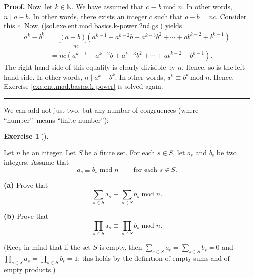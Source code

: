 \documentclass[numbers=enddot,12pt,final,onecolumn,notitlepage]{scrartcl}%
\newcounter{exer}
\numberwithin{exer}{subsection}
\theoremstyle{definition}
\newtheorem{exmp}[exer]{Exercise}
\newenvironment{exercise}[1][]
{\begin{exmp}[#1]\begin{leftbar}}
{\end{leftbar}\end{exmp}}
\newenvironment{fineprint}{\begin{small}}{\end{small}}
\newenvironment{proof}[1][Proof]{\noindent\textbf{#1.} }{\ \rule{0.5em}{0.5em}}
\let\sumnonlimits\sum
\let\prodnonlimits\prod
\renewcommand{\sum}{\sumnonlimits\limits}
\renewcommand{\prod}{\prodnonlimits\limits}
\begin{document}
\begin{fineprint}
\begin{proof}
Now, let $k\in\mathbb{N}$. We have assumed that $a\equiv b\operatorname{mod}%
n$. In other words, $n\mid a-b$. In other words, there exists an integer $c$
such that $a-b=nc$. Consider this $c$. Now,
(\ref{sol.exe.ent.mod.basics.k-power.2nd.gs}) yields%
\begin{align*}
a^{k}-b^{k}  &  =\underbrace{\left(  a-b\right)  }_{=nc}\left(  a^{k-1}%
+a^{k-2}b+a^{k-3}b^{2}+\cdots+ab^{k-2}+b^{k-1}\right) \\
&  =nc\left(  a^{k-1}+a^{k-2}b+a^{k-3}b^{2}+\cdots+ab^{k-2}+b^{k-1}\right)  .
\end{align*}
The right hand side of this equality is clearly divisible by $n$. Hence, so is
the left hand side. In other words, $n\mid a^{k}-b^{k}$. In other words,
$a^{k}\equiv b^{k}\operatorname{mod}n$. Hence, Exercise
\ref{exe.ent.mod.basics.k-power} is solved again.
\end{proof}
\end{fineprint}

We can add not just two, but any number of congruences (where
\textquotedblleft number\textquotedblright\ means \textquotedblleft finite
number\textquotedblright):

\begin{exercise}
\label{exe.ent.mod.k-sum}Let $n$ be an integer. Let $S$ be a finite set. For
each $s\in S$, let $a_{s}$ and $b_{s}$ be two integers. Assume that%
\begin{equation}
a_{s}\equiv b_{s}\operatorname{mod}n\ \ \ \ \ \ \ \ \ \ \text{for each }s\in
S. \label{eq.exe.ent.mod.k-sum.ass}%
\end{equation}


\textbf{(a)} Prove that%
\begin{equation}
\sum_{s\in S}a_{s}\equiv\sum_{s\in S}b_{s}\operatorname{mod}n.
\label{eq.exe.ent.mod.k-sum.a}%
\end{equation}


\textbf{(b)} Prove that
\begin{equation}
\prod_{s\in S}a_{s}\equiv\prod_{s\in S}b_{s}\operatorname{mod}n.
\label{eq.exe.ent.mod.k-sum.b}%
\end{equation}


(Keep in mind that if the set $S$ is empty, then $\sum_{s\in S}a_{s}%
=\sum_{s\in S}b_{s}=0$ and $\prod_{s\in S}a_{s}=\prod_{s\in S}b_{s}=1$; this
holds by the definition of empty sums and of empty products.)
\end{exercise}
\end{document}
